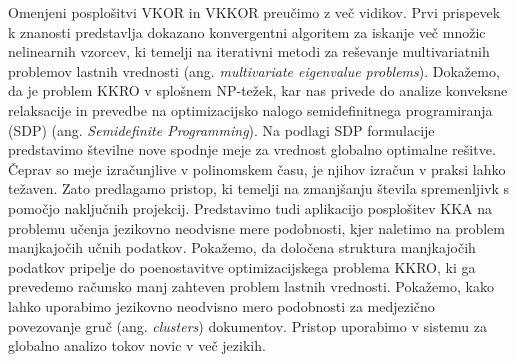 Omenjeni posplošitvi VKOR in VKKOR preučimo z več vidikov. Prvi prispevek k znanosti predstavlja
dokazano konvergentni algoritem za iskanje več množic nelinearnih vzorcev,
ki temelji na iterativni metodi za reševanje multivariatnih problemov lastnih vrednosti (ang.
\emph{multivariate eigenvalue problems}). Dokažemo, da je problem KKRO v splošnem NP-težek,
kar nas privede do analize konveksne relaksacije in prevedbe na optimizacijsko nalogo
semidefinitnega programiranja (SDP) (ang. \emph{Semidefinite Programming}). Na podlagi
SDP formulacije predstavimo številne nove spodnje meje za vrednost globalno optimalne
rešitve. Čeprav so meje izračunjlive v polinomskem času, je njihov izračun v praksi
lahko težaven. Zato predlagamo pristop, ki temelji na zmanjšanju števila spremenljivk s
pomočjo naključnih projekcij. Predstavimo tudi aplikacijo posplošitev KKA na problemu
učenja jezikovno neodvisne mere podobnosti, kjer naletimo na problem manjkajočih
učnih podatkov. Pokažemo, da določena struktura manjkajočih podatkov pripelje do
poenostavitve optimizacijskega problema KKRO, ki ga prevedemo računsko manj zahteven
problem lastnih vrednosti. Pokažemo, kako lahko uporabimo jezikovno neodvisno mero podobnosti
za medjezično povezovanje gruč (ang. \emph{clusters}) dokumentov. Pristop uporabimo v sistemu za globalno analizo
tokov novic v več jezikih.


